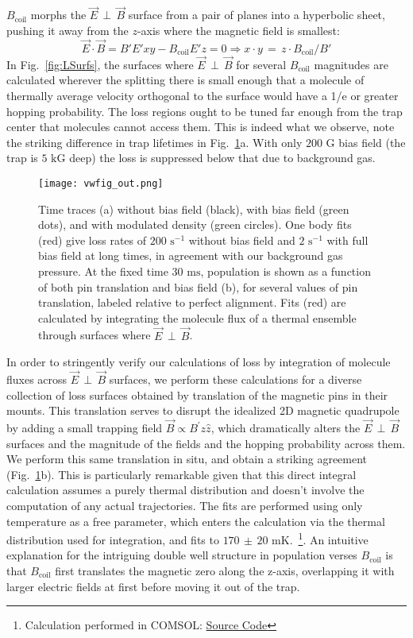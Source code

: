 \documentclass[%
 reprint,
 amsmath,amssymb,
 aps,
prl,
]{revtex4-1}
\newcommand{\bcl}{{$B_\text{coil}$}}
\newcommand{\epb}{{$\vec{E}\,{\perp}\,\vec{B}$}}
\begin{document}
\bcl{} morphs the \epb{} surface from a pair of planes into a hyperbolic sheet, pushing it away from the $z$-axis where the magnetic field is smallest:
\begin{equation}
\vec{E}\cdot\vec{B}=B'E'xy - B_\text{coil}E'z=0\Rightarrow x\cdot y\,{=}\, z\cdot B_\text{coil}/B'
\end{equation}
In Fig.~\ref{fig:LSurfs}, the surfaces where \epb{} for several \bcl{} magnitudes are calculated wherever the splitting there is small enough that a molecule of thermally average velocity orthogonal to the surface would have a 1/e or greater hopping probability.
The loss regions ought to be tuned far enough from the trap center that molecules cannot access them.
This is indeed what we observe, note the striking difference in trap lifetimes in Fig.~\ref{fig:WVplot}a.
With only $200\text{ G}$ bias field (the trap is $5\text{ kG}$ deep) the loss is suppressed below that due to background gas.

\begin{figure}[tb]
\texttt{[image: vwfig\_out.png]}%
\caption{
Time traces (a) without bias field (black), with bias field (green dots), and with modulated density (green circles). 
One body fits (red) give loss rates of $200\text{ s}^{-1}$ without bias field and $2\text{ s}^{-1}$ with full bias field at long times, in agreement with our background gas pressure. 
At the fixed time $30\text{ ms}$, population is shown as a function of both pin translation and bias field (b), for several values of pin translation, labeled relative to perfect alignment. 
Fits (red) are calculated by integrating the molecule flux of a thermal ensemble through surfaces where \epb.
\label{fig:WVplot}}
\end{figure}

In order to stringently verify our calculations of loss by integration of molecule fluxes across \epb{} surfaces, we perform these calculations for a diverse collection of loss surfaces obtained by translation of the magnetic pins in their mounts. 
This translation serves to disrupt the idealized 2D magnetic quadrupole by adding a small trapping field $\vec{B}\propto B^\prime z\hat{z}$, which dramatically alters the \epb{} surfaces and the magnitude of the fields and the hopping probability across them.
We perform this same translation in situ, and obtain a striking agreement (Fig.~\ref{fig:WVplot}b). 
This is particularly remarkable given that this direct integral calculation assumes a purely thermal distribution and doesn't involve the computation of any actual trajectories.
The fits are performed using only temperature as a free parameter, which enters the calculation via the thermal distribution used for integration, and fits to $170\,{\pm}\,20\text{ mK}$.~\footnote{Calculation performed in COMSOL: \href{https://github.com/dreens/spin-flip-integration/}{Source Code}}.
An intuitive explanation for the intriguing double well structure in population verses \bcl{} is that \bcl{} first translates the magnetic zero along the z-axis, overlapping it with larger electric fields at first before moving it out of the trap.
\end{document}
